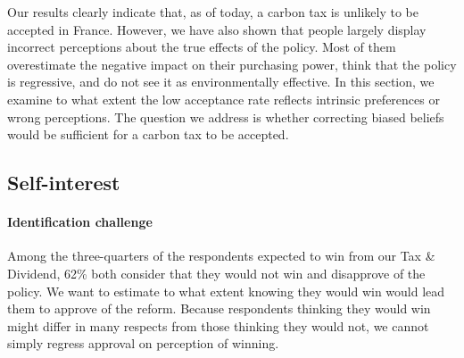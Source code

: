 \documentclass[12pt]{article} %
\begin{document}
Our results clearly indicate that, as of today, a carbon tax is unlikely to be accepted in France. However, we have also shown that people largely display incorrect perceptions about the true effects of the policy. Most of them overestimate the negative impact on their purchasing power, think that the policy is regressive, and do not see it as environmentally effective. In this section, we examine to what extent the low acceptance rate reflects intrinsic preferences or wrong perceptions. The question we address is whether correcting biased beliefs would be sufficient for a carbon tax to be accepted. 

    \subsection{Self-interest}

\paragraph{Identification challenge}

Among the three-quarters of the respondents expected to win from our Tax \& Dividend, 62\% both consider that they would not win and disapprove of the policy. We want to estimate to what extent knowing they would win would lead them to approve of the reform. Because respondents thinking they would win might differ in many respects from those thinking they would not, we cannot simply regress approval on perception of winning. 

\end{document}
